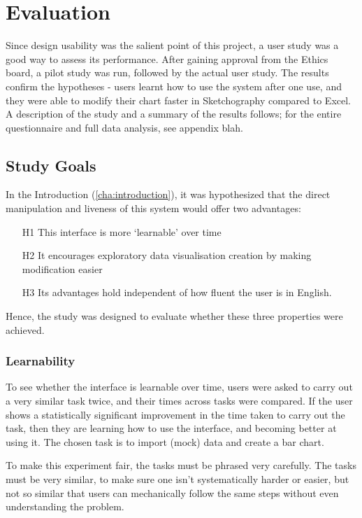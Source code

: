 \chapter{Evaluation}
Since design usability was the salient point of this project, a user study was a good way to assess its performance. After gaining approval from the Ethics board, a pilot study was run, followed by the actual user study. The results confirm the hypotheses - users learnt how to use the system after one use, and they were able to modify their chart faster in Sketchography compared to Excel. A description of the study and a summary of the results follows; for the entire questionnaire and full data analysis, see appendix blah.

\section{Study Goals}
In the Introduction (\autoref{cha:introduction}), it was hypothesized that the direct manipulation and liveness of this system would offer two advantages:

\begin{enumerate}
\item[H1] This interface is more `learnable' over time
\item[H2] It encourages exploratory data visualisation creation by making modification easier
\item[H3] Its advantages hold independent of how fluent the user is in English.
\end{enumerate}

Hence, the study was designed to evaluate whether these three properties were achieved. 

\subsection*{Learnability}
To see whether the interface is learnable over time, users were asked to carry out a very similar task twice, and their times across tasks were compared. If the user shows a statistically significant improvement in the time taken to carry out the task, then they are learning how to use the interface, and becoming better at using it. The chosen task is to import (mock) data and create a bar chart.

To make this experiment fair, the tasks must be phrased very carefully. The tasks must be very similar, to make sure one isn't systematically harder or easier, but not so similar that users can mechanically follow the same steps without even understanding the problem.

